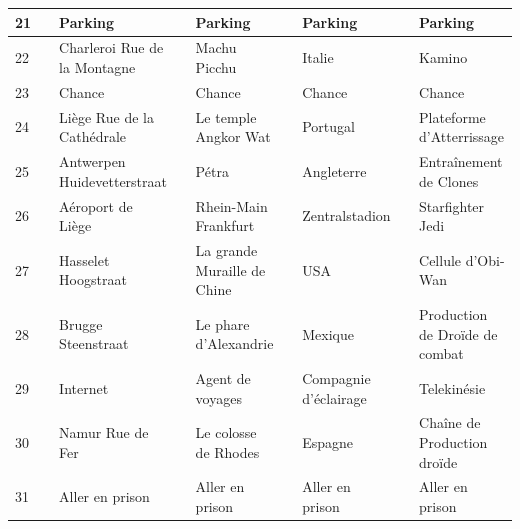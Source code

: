 \documentclass[letterpaper]{article}
\begin{document}
{\begin{tabular}{|l|l|l|l|l|l|l|l|l|}
      21 & \cellcolor[HTML]{FFFFFF} & Parking & \cellcolor[HTML]{FFFFFF} & Parking & \cellcolor[HTML]{FFFFFF} & Parking & \cellcolor[HTML]{FFFFFF} & Parking \\ \hline
      22 & \cellcolor[HTML]{FF4500} & Charleroi Rue de la Montagne & \cellcolor[HTML]{FF4500} & Machu Picchu & \cellcolor[HTML]{FF4500} & Italie & \cellcolor[HTML]{FF4500} & Kamino \\ \hline
      23 & \cellcolor[HTML]{FFC1C1} & Chance & \cellcolor[HTML]{FFC1C1} & Chance & \cellcolor[HTML]{FFC1C1} & Chance & \cellcolor[HTML]{FFC1C1} & Chance \\ \hline
      24 & \cellcolor[HTML]{FF4500} & Liège Rue de la Cathédrale & \cellcolor[HTML]{FF4500} & Le temple Angkor Wat & \cellcolor[HTML]{FF4500} & Portugal & \cellcolor[HTML]{FF4500} & Plateforme d'Atterrissage \\ \hline
      25 & \cellcolor[HTML]{FF4500} & Antwerpen Huidevetterstraat & \cellcolor[HTML]{FF4500} & Pétra & \cellcolor[HTML]{FF4500} & Angleterre & \cellcolor[HTML]{FF4500} & Entraînement de Clones \\ \hline
      26 & \cellcolor[HTML]{E6E6FA} & Aéroport de Liège & \cellcolor[HTML]{E6E6FA} & Rhein-Main Frankfurt & \cellcolor[HTML]{E6E6FA} & Zentralstadion & \cellcolor[HTML]{E6E6FA} & Starfighter Jedi \\ \hline
      27 & \cellcolor[HTML]{FFD700} & Hasselet Hoogstraat & \cellcolor[HTML]{FFD700} & La grande Muraille de Chine & \cellcolor[HTML]{FFD700} & USA & \cellcolor[HTML]{FFD700} & Cellule d'Obi-Wan \\ \hline
      28 & \cellcolor[HTML]{FFD700} & Brugge Steenstraat & \cellcolor[HTML]{FFD700} & Le phare d'Alexandrie & \cellcolor[HTML]{FFD700} & Mexique & \cellcolor[HTML]{FFD700} & Production de Droïde de combat \\ \hline
      29 & \cellcolor[HTML]{FFFFF0} & Internet & \cellcolor[HTML]{FFFFF0} & Agent de voyages & \cellcolor[HTML]{FFFFF0} & Compagnie d'éclairage & \cellcolor[HTML]{FFFFF0} & Telekinésie \\ \hline
      30 & \cellcolor[HTML]{FFD700} & Namur Rue de Fer & \cellcolor[HTML]{FFD700} & Le colosse de Rhodes & \cellcolor[HTML]{FFD700} & Espagne & \cellcolor[HTML]{FFD700} & Chaîne de Production droïde \\ \hline
      31 & \cellcolor[HTML]{BEBEBE} & Aller en prison & \cellcolor[HTML]{BEBEBE} & Aller en prison & \cellcolor[HTML]{BEBEBE} & Aller en prison & \cellcolor[HTML]{BEBEBE} & Aller en prison \\ \hline

\end{tabular}}
\end{document}
